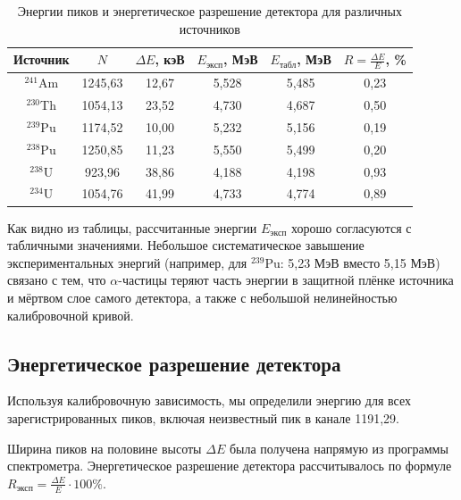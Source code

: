 \documentclass[12pt, a4paper]{article}
\begin{document}
\begin{table}[H]
\centering
\begin{tabular}{|c|c|c|c|c|c|}
\hline
Источник & $N$ & $\Delta E$, кэВ & $E_{\text{эксп}}$, МэВ & $E_{\text{табл}}$, МэВ & $R = \frac{\Delta E}{E}$, \% \\
\hline
$^{241}$Am & 1245,63 & 12,67 & 5,528 & 5,485 & 0,23 \\
$^{230}$Th & 1054,13 & 23,52 & 4,730 & 4,687 & 0,50 \\
$^{239}$Pu & 1174,52 & 10,00 & 5,232 & 5,156 & 0,19 \\
$^{238}$Pu & 1250,85 & 11,23 & 5,550 & 5,499 & 0,20 \\
$^{238}$U  &  923,96 & 38,86 & 4,188 & 4,198 & 0,93 \\
$^{234}$U  & 1054,76 & 41,99 & 4,733 & 4,774 & 0,89 \\
\hline
\end{tabular}
\caption{Энергии пиков и энергетическое разрешение детектора для различных источников}
\label{tab:energies_resolution}
\end{table}

Как видно из таблицы, рассчитанные энергии $E_{\text{эксп}}$ хорошо согласуются с табличными значениями. Небольшое систематическое завышение экспериментальных энергий (например, для $^{239}$Pu: 5,23 МэВ вместо 5,15 МэВ) связано с тем, что $\alpha$-частицы теряют часть энергии в защитной плёнке источника и мёртвом слое самого детектора, а также с небольшой нелинейностью калибровочной кривой.



\subsection*{Энергетическое разрешение детектора}

Используя калибровочную зависимость, мы определили энергию для всех зарегистрированных пиков, включая неизвестный пик в канале 1191,29.%

Ширина пиков на половине высоты $\Delta E$ была получена напрямую из программы спектрометра. Энергетическое разрешение детектора рассчитывалось по формуле $R_{\text{эксп}} = \frac{\Delta E}{E} \cdot 100\%$. 
\end{document}
